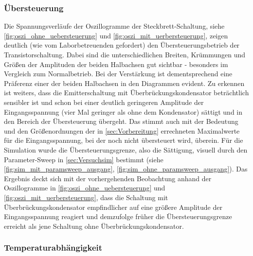 \documentclass[12pt,english,ngerman]{scrartcl}
\begin{document}
\subsubsection{Übersteuerung}
Die Spannungsverläufe der Oszillogramme der Steckbrett-Schaltung, siehe 
\autoref{fig:oszi_ohne_uebersteuerung} und \autoref{fig:oszi_mit_uerbersteuerung}, zeigen deutlich (wie vom
Laborbetreuenden gefordert) den Übersteuerungsbetrieb der Transistorschaltung. Dabei sind die 
unterschiedlichen Breiten, Krümmungen und Größen der Amplituden der beiden Halbachsen gut sichtbar - 
besonders im Vergleich zum Normalbetrieb. Bei der Verstärkung ist dementsprechend eine Präferenz einer der beiden Halbachsen in den Diagrammen evident. Zu erkennen ist weiters, dass die Emitterschaltung mit 
Überbrückungskondensator beträchtlich sensibler ist und schon bei einer deutlich geringeren Amplitude der 
Eingangsspannung (vier Mal geringer als ohne dem Kondensator) sättigt und in den Bereich der Übersteuerung
übergeht. Das stimmt auch mit der Bedeutung und den Größenordnungen der in \autoref{sec:Vorbereitung} errechneten Maximalwerte für die Eingangsspannung, bei der noch nicht übersteuert wird, überein.
\newline
Für die Simulation wurde die Übersteuerungsgrenze, also die Sättigung, visuell durch den Parameter-Sweep in
\autoref{sec:Versuchsim} bestimmt (siehe \autoref{fig:sim_mit_paramsweep_ausgang}, \autoref{fig:sim_ohne_paramsweep_ausgang}). Das Ergebnis deckt sich mit der vorhergehenden Beobachtung anhand der 
Oszillogramme in \autoref{fig:oszi_ohne_uebersteuerung} und \autoref{fig:oszi_mit_uerbersteuerung}, dass 
die Schaltung mit Überbrückungskondensator empfindlicher auf eine größere Amplitude der Eingangsspannung 
reagiert und demzufolge früher die Übersteuerungsgrenze erreicht als jene Schaltung ohne 
Überbrückungskondensator.

\subsubsection{Temperaturabhängigkeit}
\end{document}
